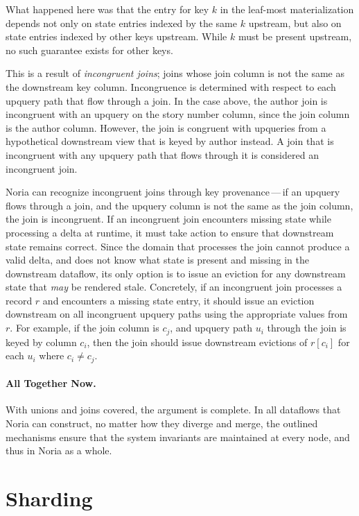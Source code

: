 What happened here was that the entry for key $k$ in the leaf-most
materialization depends not only on state entries indexed by the same $k$
upstream, but also on state entries indexed by other keys upstream. While $k$
must be present upstream, no such guarantee exists for other keys.

This is a result of \textit{incongruent joins}; joins whose join column is not
the same as the downstream key column. Incongruence is determined with respect
to each upquery path that flow through a join. In the case above, the author
join is incongruent with an upquery on the story number column, since the join
column is the author column. However, the join is congruent with upqueries from
a hypothetical downstream view that is keyed by author instead. A join that is
incongruent with any upquery path that flows through it is considered an
incongruent join.

Noria can recognize incongruent joins through key provenance\,---\,if an upquery
flows through a join, and the upquery column is not the same as the join column,
the join is incongruent. If an incongruent join encounters missing state while
processing a delta at runtime, it must take action to ensure that downstream
state remains correct. Since the domain that processes the join cannot produce a
valid delta, and does not know what state is present and missing in the
downstream dataflow, its only option is to issue an eviction for any downstream
state that \emph{may} be rendered stale. Concretely, if an incongruent join
processes a record $r$ and encounters a missing state entry, it should issue an
eviction downstream on all incongruent upquery paths using the appropriate
values from $r$. For example, if the join column is $c_j$, and upquery path
$u_i$ through the join is keyed by column $c_i$, then the join should issue
downstream evictions of $r[c_i]$ for each $u_i$ where $c_i \neq c_j$.

\paragraph{All Together Now.}
%
With unions and joins covered, the argument is complete. In all dataflows that
Noria can construct, no matter how they diverge and merge, the outlined
mechanisms ensure that the system invariants are maintained at every node, and
thus in Noria as a whole.

\section{Sharding}
\label{s:challenge:sharding}

